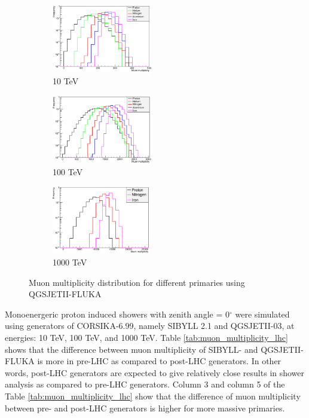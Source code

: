 \documentclass[12pt]{article}
\begin{document}
\begin{figure}
\begin{subfigure}{0.32\textwidth}
\includegraphics[width=0.9\linewidth, height=3cm]{qgsiimm10} 
\caption{10 TeV}
\label{fig:qgsiimm10}
\end{subfigure}
\begin{subfigure}{0.32\textwidth}
\includegraphics[width=0.9\linewidth, height=3cm]{qgsiimm100} 
\caption{100 TeV}
\label{fig:qgsiimm100}
\end{subfigure}
\begin{subfigure}{0.32\textwidth}
\includegraphics[width=0.9\linewidth, height = 3cm]{qgsiimm1000} 
\caption{1000 TeV}
\label{fig:qgsiimm1000}
\end{subfigure}
\caption{Muon multiplicity distribution for different primaries using QGSJETII-FLUKA}
\label{fig:qgsiimm}
\end{figure}


Monoenergeric proton induced showers with zenith angle = 0$^\circ$ were simulated using generators of CORSIKA-6.99, namely SIBYLL 2.1 and QGSJETII-03, at energies: 10 TeV, 100 TeV, and 1000 TeV. Table \ref{tab:muon_multiplicity_lhc} shows that the difference between muon multiplicity of SIBYLL- and QGSJETII-FLUKA is more in pre-LHC as compared to post-LHC generators. In other words, post-LHC generators are expected to give relatively close results in shower analysis as compared to pre-LHC generators. Column 3 and column 5 of the Table \ref{tab:muon_multiplicity_lhc} show that the difference of muon multiplicity between pre- and post-LHC generators is higher for more massive primaries. 
\end{document}
